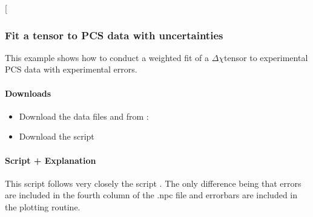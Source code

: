 \documentclass[a4paper,10pt,english,openany,oneside]{sphinxmanual}
\begin{document}
\begin{sphinxVerbatim}[commandchars=\\\{\}]
\end{sphinxVerbatim}

\sphinxAtStartPar
{} {[}\sphinxcode{\sphinxupquote{pcs\_fit\_constrained.png}}{]}

\noindent{}


\subsubsection{Fit a tensor to PCS data with uncertainties}
\label{\detokenize{examples/pcs_fit_error:fit-a-tensor-to-pcs-data-with-uncertainties}}\label{\detokenize{examples/pcs_fit_error:pcs-fit-error}}\label{\detokenize{examples/pcs_fit_error::doc}}
\sphinxAtStartPar
This example shows how to conduct a weighted fit of a \({\Delta\chi}\)\sphinxhyphen{}tensor to experimental PCS data with experimental errors.


\paragraph{Downloads}
\label{\detokenize{examples/pcs_fit_error:downloads}}\begin{itemize}
\item {} 
\sphinxAtStartPar
Download the data files  and  from :

\item {} 
\sphinxAtStartPar
Download the script 

\end{itemize}


\paragraph{Script + Explanation}
\label{\detokenize{examples/pcs_fit_error:script-explanation}}
\sphinxAtStartPar
This script follows very closely the script {\hyperref[\detokenize{examples/pcs_fit:pcs-fit}]{}}. The only difference being that errors are included in the fourth column of the .npc file and errorbars are included in the plotting routine.
\end{document}
